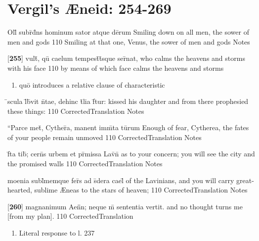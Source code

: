\section{Vergil's {\AE}neid:  254-269} %

\latline
  {Oll\={\macron {\i}} subr\={\macron {\i}}d\={}ns hominum sator atque de\={}rum}
  { Smiling down on all men, the sower of men and gods }
  {110}
  { Smiling at that one, Venus, the sower of men and gods }
  { Notes }


\latline
  {[\textbf{255}] vult\={}, qu\={} caelum tempest\={}t\={}sque ser\={}nat,}
  { who calms the heavens and storms with his face }
  {110}
  { by means of which face calms the heavens and storms }
  { \begin{enumerate}
  	\item qu\={o} introduces a relative clause of characteristic
  \end{enumerate} }


\latline
  {\={}scula l\={\macron {\i}}b\={}vit n\={}tae, dehinc t\={}lia f\={}tur:}
  { kissed his daughter and from there prophesied these things: }
  {110}
  { CorrectedTranslation }
  { Notes }


\latline
  {``Parce met\={}, Cyther\={}a, manent imm\={}ta tu\={}rum}
  { Enough of fear, Cytherea, the fates of your people remain unmoved  }
  {110}
  { CorrectedTranslation }
  { Notes }


\latline
  {f\={}ta tib\={\macron {\i}}; cern\={}s urbem et pr\={}missa Lav\={\macron {\i}}n\={\macron {\i}}}
  { as to your concern; you will see the city and the promised walls }
  {110}
  { CorrectedTranslation }
  { Notes }


\latline
  {moenia subl\={\macron {\i}}memque fer\={}s ad s\={\macron {\i}}dera cael\={\macron {\i}}}
  { of the Lavinians, and you will carry great-hearted, sublime {\AE}neas to the stars of heaven;  }
  {110}
  { CorrectedTranslation }
  { Notes }


\latline
  {[\textbf{260}] magnanimum Aen\={}\={}n; neque m\={} sententia vertit.}
  { and no thought turns me [from my plan]. }
  {110}
  { CorrectedTranslation }
  { \begin{enumerate}
  	\item Literal response to l. 237
  \end{enumerate} }


